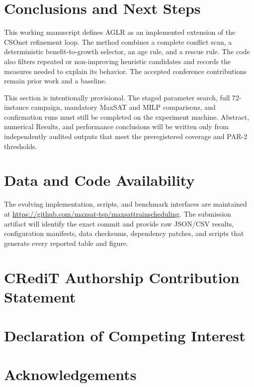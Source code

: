 \documentclass[preprint,12pt,authoryear]{elsarticle}
\begin{document}
\section{Conclusions and Next Steps}
\label{sec:conclusion}

This working manuscript defines AGLR as an implemented extension of the CSOnet
refinement loop. The method combines a complete conflict scan, a deterministic
benefit-to-growth selector, an age rule, and a rescue rule. The code also
filters repeated or non-improving heuristic candidates and records the measures
needed to explain its behavior. The accepted conference contributions remain
prior work and a baseline.

This section is intentionally provisional. The staged parameter search, full
72-instance campaign, mandatory MaxSAT and MILP comparisons, and confirmation
runs must still be completed on the experiment machine. Abstract, numerical
Results, and performance conclusions will be written only from independently
audited outputs that meet the preregistered coverage and PAR-2 thresholds.

\section*{Data and Code Availability}

The evolving implementation, scripts, and benchmark interfaces are maintained
at \url{https://github.com/maxsat-tsp/maxsattrainscheduling}. The submission
artifact will identify the exact commit and provide raw JSON/CSV results,
configuration manifests, data checksums, dependency patches, and scripts that
generate every reported table and figure.

\section*{CRediT Authorship Contribution Statement}


\section*{Declaration of Competing Interest}


\section*{Acknowledgements}




\end{document}
